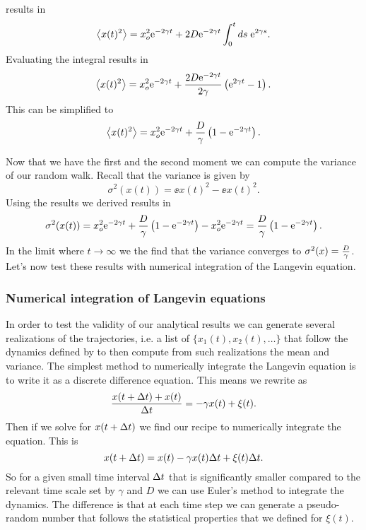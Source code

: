 results in
\begin{equation}
   \left\langle x(t)^2 \right\rangle = 
   x_o^2 \mathrm{e}^{-2\gamma t} +
   2D \mathrm{e}^{-2 \gamma t} \int_0^t ds\; \mathrm{e}^{2 \gamma s}.
\end{equation}
Evaluating the integral results in
\begin{equation}
   \left\langle x(t)^2 \right\rangle = 
   x_o^2 \mathrm{e}^{-2\gamma t} +
   {2D \mathrm{e}^{-2\gamma t} \over 2 \gamma}\left( \mathrm{e}^{2 \gamma t} - 1 \right).
\end{equation}
This can be simplified to
\begin{equation}
   \left\langle x(t)^2 \right\rangle = 
   x_o^2 \mathrm{e}^{-2\gamma t} +
   {D \over \gamma} \left( 1 - \mathrm{e}^{-2 \gamma t} \right).
\end{equation}

Now that we have the first and the second moment we can compute the variance of
our random walk. Recall that the variance is given by
\begin{equation}
  \sigma^2(x(t)) = \ee{x(t)^2} - \ee{x(t)}^2.
  \label{eq_walker_var}
\end{equation}
Using the results we derived results in
\begin{equation}
  \sigma^2(x(t)) = x_o^2 \mathrm{e}^{-2\gamma t} +
   {D \over \gamma} \left( 1 - \mathrm{e}^{-2 \gamma t} \right) -
   x_o^2 \mathrm{e}^{-2\gamma t} = 
   {D \over \gamma} \left( 1 - \mathrm{e}^{-2 \gamma t} \right).
\end{equation}
In the limit where $t \rightarrow \infty$ we the find that the variance
converges to $\sigma^2(x) = {D \over \gamma}$. Let's now test these results
with numerical integration of the Langevin equation.

\subsubsection{Numerical integration of Langevin equations}

In order to test the validity of our analytical results we can generate several
realizations of the trajectories, i.e. a list of $\{x_1(t), x_2(t), \ldots \}$
that follow the dynamics defined by  to then
compute from such realizations the mean and variance. The simplest method to
numerically integrate the Langevin equation is to write it as a discrete
difference equation. This means we rewrite  as
\begin{equation}
  {x(t + \Delta t) + x(t) \over \Delta t} = -\gamma x(t) + \xi(t).
\end{equation}
Then if we solve for $x(t + \Delta t)$ we find our recipe to numerically integrate
the equation. This is
\begin{equation}
  x(t + \Delta t) = x(t) - \gamma x(t) \Delta t + \xi(t) \Delta t.
  \label{eq_discrete_walker}
\end{equation}
So for a given small time interval $\Delta t$ that is significantly smaller compared
to the relevant time scale set by $\gamma$ and $D$ we can use Euler's method to
integrate the dynamics. The difference is that at each time step we can
generate a pseudo-random number that follows the statistical properties that we
defined for $\xi(t)$.

